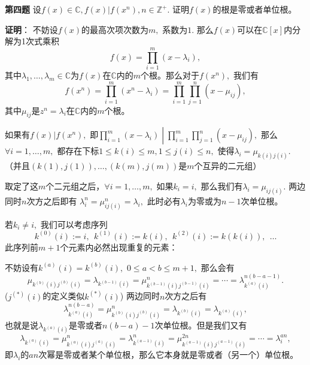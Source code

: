 {\bf 第四题} 设$f(x) \in \mathbb{C}, f(x) | f(x^n), n \in \mathbb{Z}^+.$ 证明$f(x)$的根是零或者单位根。

\ifIncludeAnswer

\newpageorvspace

{\bf 证明}： 不妨设$f(x)$的最高次项次数为$m,$ 系数为$1.$ 那么$f(x)$可以在$\mathbb{C}[x]$内分解为1次式乘积
$$f(x) = \prod\limits_{i=1}^m (x - \lambda_i),$$
其中$\lambda_1, \ldots, \lambda_m \in \mathbb{C}$为$f(x)$在$\mathbb{C}$内的$m$个根。那么对于$f(x^n),$ 我们有
$$f(x^n) = \prod\limits_{i=1}^m (x^n - \lambda_i) = \prod\limits_{i=1}^m \prod\limits_{j=1}^n (x - \mu_{ij}),$$
其中$\mu_{ij}$是$z^n = \lambda_i$在$\mathbb{C}$内的$m$个根。

如果有$f(x) | f(x^n),$ 即$\left.\prod\limits_{i=1}^m (x - \lambda_i) \middle| \prod\limits_{i=1}^m \prod\limits_{j=1}^n (x - \mu_{ij}) \right.,$ 那么$\forall i = 1, \ldots, m,$ 都存在下标$1 \leqslant k(i) \leqslant m, 1 \leqslant j(i) \leqslant n,$ 使得$\lambda_i = \mu_{k(i)j(i)}.$ （并且$(k(1), j(1)), \ldots, (k(m), j(m))$是$m$个互异的二元组）

取定了这$m$个二元组之后，$\forall i = 1, \ldots, m,$ 如果$k_i = i,$ 那么我们有$\lambda_i = \mu_{ij(i)}.$ 两边同时$n$次方之后即有
$\lambda_i^n = \mu_{ij(i)}^n = \lambda_i,$ 此时必有$\lambda_i$为零或为$n - 1$次单位根。

若$k_i \neq i,$ 我们可以考虑序列
$$k^{(0)}(i) := i, ~~ k^{(1)}(i) := k(i), ~~ k^{(2)}(i) := k(k(i)), ~~ \ldots$$
此序列前$m+1$个元素内必然出现重复的元素：
\begin{figure}[H]
\centering
{}
\end{figure}
不妨设有$k^{(a)}(i) = k^{(b)}(i),$ $0 \leqslant a < b \leqslant m+1,$ 那么会有
$$\mu_{k^{(b)}(i)j^{(b)}(i)} = \lambda_{k^{(b-1)}(i)} = \mu_{k^{(b-1)}(i)j^{(b-1)}(i)}^n = \cdots = \lambda_{k^{(a)}(i)}^{n(b-a-1)}.$$
($j^{(*)}(i)$的定义类似$k^{(*)}(i)$) 两边同时$n$次方之后有
$$\lambda_{k^{(a)}(i)}^{n(b-a)} = \mu_{k^{(b)}(i)j^{(b)}(i)}^n = \lambda_{k^{(b)}(i)} = \lambda_{k^{(a)}(i)},$$
也就是说$\lambda_{k^{(a)}(i)}$是零或者$n(b-a) - 1$次单位根。但是我们又有
$$\lambda_{k^{(a)}(i)} = \mu_{k^{(a)}(i)j^{(a)}(i)}^n = \lambda_{k^{(a-1)}(i)}^n = \mu_{k^{(a-1)}(i)j^{(a-1)}(i)}^{2n} = \cdots = \lambda_{i}^{an},$$
即$\lambda_{i}$的$an$次幂是零或者某个单位根，那么它本身就是零或者（另一个）单位根。

